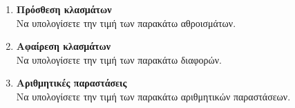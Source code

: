 \documentclass[twoside,nofonts,internet]{askhseis}
\begin{document}
\begin{enumerate}
\begin{multicols}{4}
\end{multicols}
\item \textbf{Πρόσθεση κλασμάτων}\\
Να υπολογίσετε την τιμή των παρακάτω αθροισμάτων.
\begin{multicols}{2}
\end{multicols}
\item \textbf{Αφαίρεση κλασμάτων}\\
Να υπολογίσετε την τιμή των παρακάτω διαφορών.
\begin{multicols}{2}
\end{multicols}
\item \textbf{Αριθμητικές παραστάσεις}\\
Να υπολογίσετε την τιμή των παρακάτω αριθμητικών παραστάσεων.
\begin{multicols}{2}
\end{multicols}

\end{enumerate}
\end{document}
